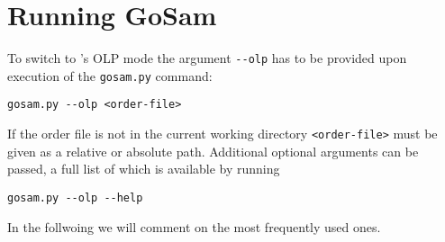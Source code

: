 %
%
%
%

\section{Running GoSam}\label{sec:BLHA_running}
To switch to \gosam's OLP mode the argument \lstinline[style=sh]|--olp| has to be provided upon execution of the \lstinline[style=sh]|gosam.py| command:
\begin{lstlisting}[style=sh]
gosam.py --olp <order-file>
\end{lstlisting}
If the order file is not in the current working directory \lstinline[style=sh]|<order-file>| must be given as a relative or absolute path. Additional optional arguments can be passed, a full list of which is available by running
\begin{lstlisting}[style=sh]
gosam.py --olp --help
\end{lstlisting}
In the follwoing we will comment on the most frequently used ones.
